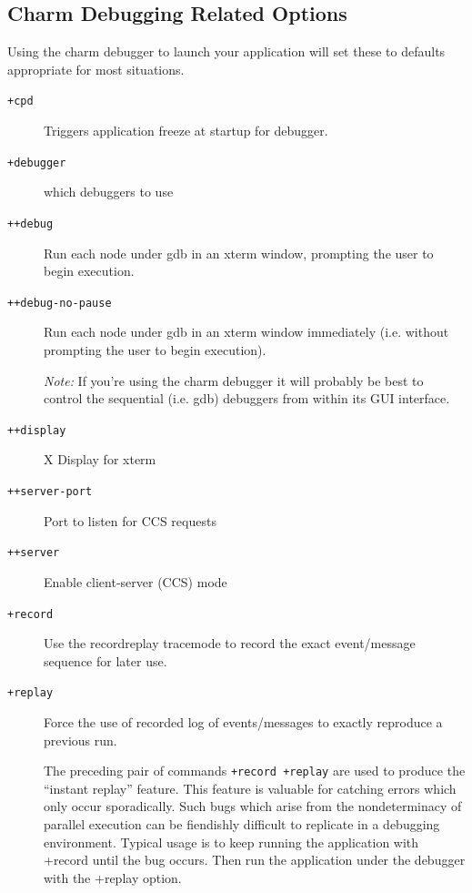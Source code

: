 \documentclass[10pt,dvips]{article}
\begin{document}

\subsection{Charm Debugging Related Options}

Using the charm debugger to launch your application will set these
to defaults appropriate for most situations.

\begin{description}

\item[{\tt +cpd}] Triggers application freeze at startup for debugger.

\item[{\tt +debugger}] which debuggers to use

\item[{\tt ++debug}] Run each node under gdb in an xterm window, prompting
the user to begin execution.

\item[{\tt ++debug-no-pause}] Run each node under gdb in an xterm window
immediately (i.e. without prompting the user to begin execution).

 \emph{ Note: } If you're using the charm debugger it will probably be
 best to control the sequential (i.e. gdb) debuggers from within its
 GUI interface.
 
\item[{\tt ++display}]          X Display for xterm

\item[{\tt ++server-port}]      Port to listen for CCS requests

\item[{\tt ++server}]           Enable client-server (CCS) mode

\item[{\tt +record}]           Use the recordreplay tracemode to record the exact event/message sequence for later use.  

\item[{\tt +replay}]           Force the use of recorded log of events/messages  to exactly reproduce a previous run.

  The preceding pair of commands {\tt +record +replay} are used to
  produce the ``instant replay'' feature.  This feature is valuable
  for catching errors which only occur sporadically.  Such bugs which
  arise from the nondeterminacy of parallel execution can be
  fiendishly difficult to replicate in a debugging environment.
  Typical usage is to keep running the application with +record until
  the bug occurs.  Then run the application under the debugger with
  the +replay option.

\end{description}
\end{document}

